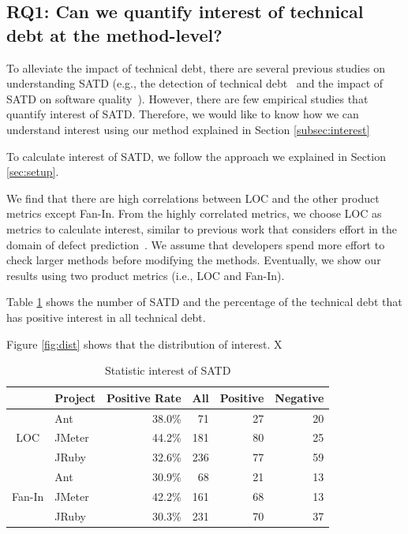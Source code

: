 \documentclass[conference]{IEEEtran}
\begin{document}
\subsection{RQ1: Can we quantify interest of technical debt at the method-level?}
To alleviate the impact of technical debt, there are several previous studies on understanding SATD (e.g., the detection of technical debt~\cite{Potdar2014ICSME,Zazworka2013EASE} and the impact of SATD on software quality~\cite{Wehaibi2016SANER}).
However, there are few empirical studies that quantify interest of SATD.
Therefore, we would like to know how we can understand interest using our method explained in Section \ref{subsec:interest}

To calculate interest of SATD, we follow the approach we explained in Section \ref{sec:setup}.

We find that there are high correlations between LOC and the other product metrics except Fan-In. 
From the highly correlated metrics, we choose LOC as metrics to calculate interest, similar to previous work that considers effort in the domain of defect prediction~\cite{Kamei2010ICSM,Kamei2013TSE}. We assume that developers spend more effort to check larger methods before modifying the methods. Eventually, we show our results using two product metrics (i.e., LOC and Fan-In).

Table \ref{tab:statistic} shows the number of SATD and the percentage of the technical debt that has positive interest in all technical debt. 

Figure \ref{fig:dist} shows that the distribution of interest. X

\begin{table}[tb]
  \caption{Statistic interest of SATD}
  \label{tab:statistic}
  \centering

  \begin{tabular}{cl|r|rrr}
  \hline
      &  Project & Positive Rate & All & Positive & Negative \\
  \hline
        & Ant    & 38.0\% &  71 &  27  &  20 \\
   LOC  & JMeter & 44.2\% & 181 &  80  &  25 \\
        & JRuby  & 32.6\% & 236 &  77  &  59 \\
  \hline
        & Ant    & 30.9\% &  68 &  21  &  13 \\
Fan-In  & JMeter & 42.2\% & 161 &  68  &  13 \\
        & JRuby  & 30.3\% & 231 &  70  &  37 \\
  \hline
  \end{tabular}
\end{table}
\end{document}
